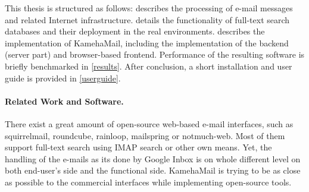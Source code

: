 This thesis is structured as follows:  describes the processing of e-mail messages and related Internet infrastructure.  details the functionality of full-text search databases and their deployment in the real environments.  describes the implementation of KamehaMail, including the implementation of the backend (server part) and browser-based frontend. Performance of the resulting software is briefly benchmarked in \cref{results}. After conclusion, a short installation and user guide is provided in \cref{userguide}.

\paragraph{Related Work and Software.}
There exist a great amount of open-source web-based e-mail interfaces, such as squirrelmail, roundcube, rainloop, mailspring or notmuch-web. Most of them support full-text search using IMAP search or other own means. Yet, the handling of the e-mails as its done by Google Inbox is on whole different level on both end-user's side and the functional side. KamehaMail is trying to be as close as possible to the commercial interfaces while implementing open-source tools.
